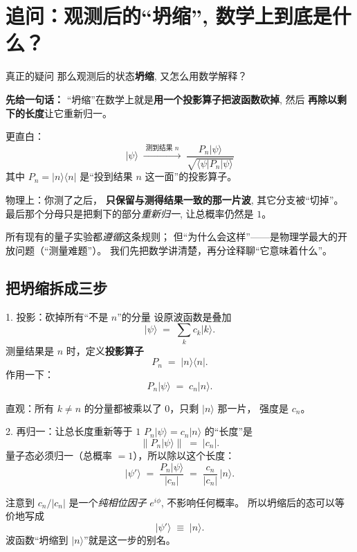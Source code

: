 \documentclass[11pt,a4paper]{ctexart}
\begin{document}
\section{追问：观测后的``坍缩'', 数学上到底是什么？}

\begin{questionblock}{真正的疑问}
那么观测后的状态\textbf{坍缩}, 又怎么用数学解释？
\end{questionblock}

\begin{answerblock}
\textbf{先给一句话：}
``坍缩''在数学上就是\textbf{用一个投影算子把波函数砍掉}, 然后
\textbf{再除以剩下的长度}让它重新归一。
\smallskip

更直白：
\[
  \boxed{\;
    \lvert\psi\rangle
    \;\xrightarrow{\;\text{测到结果 }n\;}\;
    \frac{P_n\lvert\psi\rangle}{\sqrt{\langle\psi|P_n|\psi\rangle}}
  \;}
\]
其中 $P_n = \lvert n\rangle\langle n\rvert$ 是``投到结果 $n$ 这一面''的投影算子。
\smallskip

物理上：你测了之后，
\textbf{只保留与测得结果一致的那一片波}, 其它分支被``切掉''。
最后那个分母只是把剩下的部分\emph{重新归一}, 让总概率仍然是 $1$。

\smallskip
所有现有的量子实验都\emph{遵循}这条规则；
但``为什么会这样''——是物理学最大的开放问题（``测量难题''）。
我们先把数学讲清楚，再分诠释聊``它意味着什么''。
\end{answerblock}

\subsection{把坍缩拆成三步}

\begin{stepblock}{1. 投影：砍掉所有``不是 $n$''的分量}
设原波函数是叠加
\[
  \lvert\psi\rangle \;=\; \sum_k c_k\lvert k\rangle.
\]
测量结果是 $n$ 时，定义\textbf{投影算子}
\[
  P_n \;=\; \lvert n\rangle\langle n\rvert.
\]
作用一下：
\[
  P_n\lvert\psi\rangle
  \;=\; c_n\lvert n\rangle.
\]

直观：所有 $k\ne n$ 的分量都被乘以了 $0$，只剩 $\lvert n\rangle$ 那一片，
强度是 $c_n$。
\end{stepblock}

\begin{stepblock}{2. 再归一：让总长度重新等于 $1$}
$P_n\lvert\psi\rangle = c_n\lvert n\rangle$ 的``长度''是
\[
  \|P_n\lvert\psi\rangle\|
  \;=\; |c_n|.
\]
量子态必须归一（总概率 $=1$），所以除以这个长度：
\[
  \lvert\psi'\rangle
  \;=\; \frac{P_n\lvert\psi\rangle}{|c_n|}
  \;=\; \frac{c_n}{|c_n|}\,\lvert n\rangle.
\]

注意到 $c_n/|c_n|$ 是一个\emph{纯相位因子} $e^{i\phi}$, 不影响任何概率。
所以坍缩后的态可以等价地写成
\[
  \lvert\psi'\rangle \;\equiv\; \lvert n\rangle.
\]
波函数``坍缩到 $\lvert n\rangle$''就是这一步的别名。
\end{stepblock}
\end{document}
